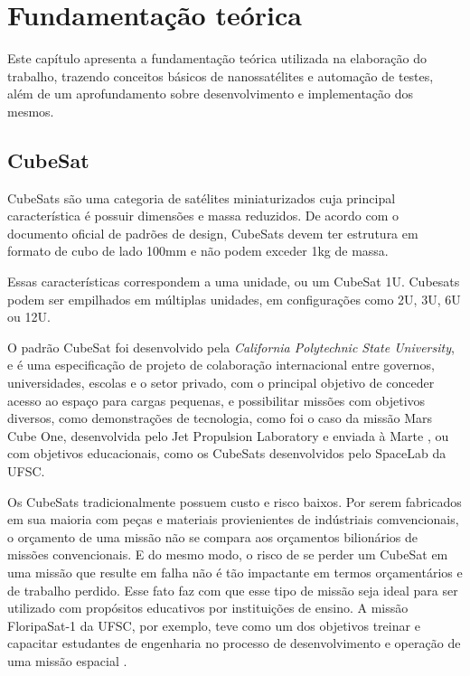 \chapter{Fundamentação teórica}
\label{chapter:fundamentacao}

Este capítulo apresenta a fundamentação teórica utilizada na elaboração do trabalho, trazendo conceitos básicos de nanossatélites e automação de testes, além de um aprofundamento sobre desenvolvimento e implementação dos mesmos.

\section{CubeSat}
\label{fundamentacao:nanosatellite}
CubeSats são uma categoria de satélites miniaturizados cuja principal característica é possuir dimensões e massa reduzidos. De acordo com o documento oficial de padrões de design\cite{cubesat-spec}, CubeSats devem ter estrutura em formato de cubo de lado 100mm e não podem exceder 1kg de massa.

Essas características correspondem a uma unidade, ou um CubeSat 1U. Cubesats podem ser empilhados em múltiplas unidades, em configurações como 2U, 3U, 6U ou 12U.

O padrão CubeSat foi desenvolvido pela \textit{California Polytechnic State University}, e é uma especificação de projeto de colaboração internacional entre governos, universidades, escolas e o setor privado, com o principal objetivo de conceder acesso ao espaço para cargas pequenas, e possibilitar missões com objetivos diversos, como demonstrações de tecnologia, como foi o caso da missão Mars Cube One, desenvolvida pelo Jet Propulsion Laboratory e enviada à Marte \cite{mars-cubesat}, ou com objetivos educacionais, como os CubeSats desenvolvidos pelo SpaceLab da UFSC.

Os CubeSats tradicionalmente possuem custo e risco baixos. Por serem fabricados em sua maioria com peças e materiais provienientes de indústriais comvencionais, o orçamento de uma missão não se compara aos orçamentos bilionários de missões convencionais. E do mesmo modo, o risco de se perder um CubeSat em uma missão que resulte em falha não é tão impactante em termos orçamentários e de trabalho perdido. Esse fato faz com que esse tipo de missão seja ideal para ser utilizado com propósitos educativos por instituições de ensino. A missão FloripaSat-1 da UFSC, por exemplo, teve como um dos objetivos treinar e capacitar estudantes de engenharia no processo de desenvolvimento e operação de uma missão espacial \cite{marcelino2020-1}.

